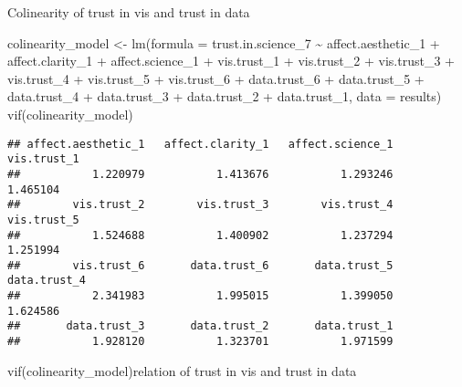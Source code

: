 \documentclass[
]{article}
\newenvironment{Shaded}{\begin{snugshade}}{\end{snugshade}}
\newcommand{\AttributeTok}[1]{\textcolor[rgb]{0.77,0.63,0.00}{#1}}
\newcommand{\FunctionTok}[1]{\textcolor[rgb]{0.00,0.00,0.00}{#1}}
\newcommand{\NormalTok}[1]{#1}
\newcommand{\OtherTok}[1]{\textcolor[rgb]{0.56,0.35,0.01}{#1}}
\newcommand{\SpecialCharTok}[1]{\textcolor[rgb]{0.00,0.00,0.00}{#1}}
\begin{document}
Colinearity of trust in vis and trust in data

\begin{Shaded}
\begin{Highlighting}[]
\NormalTok{colinearity\_model }\OtherTok{\textless{}{-}} \FunctionTok{lm}\NormalTok{(}\AttributeTok{formula =}\NormalTok{ trust.in.science\_7 }\SpecialCharTok{\textasciitilde{}}\NormalTok{ affect.aesthetic\_1 }\SpecialCharTok{+}\NormalTok{ affect.clarity\_1 }\SpecialCharTok{+}\NormalTok{ affect.science\_1 }\SpecialCharTok{+}\NormalTok{ vis.trust\_1 }\SpecialCharTok{+}\NormalTok{ vis.trust\_2 }\SpecialCharTok{+}\NormalTok{ vis.trust\_3 }\SpecialCharTok{+}\NormalTok{ vis.trust\_4 }\SpecialCharTok{+}\NormalTok{ vis.trust\_5 }\SpecialCharTok{+}\NormalTok{ vis.trust\_6 }\SpecialCharTok{+}\NormalTok{ data.trust\_6 }\SpecialCharTok{+}\NormalTok{ data.trust\_5 }\SpecialCharTok{+}\NormalTok{ data.trust\_4 }\SpecialCharTok{+}\NormalTok{ data.trust\_3 }\SpecialCharTok{+}\NormalTok{ data.trust\_2 }\SpecialCharTok{+}\NormalTok{ data.trust\_1,}
            \AttributeTok{data =}\NormalTok{ results)}
\FunctionTok{vif}\NormalTok{(colinearity\_model)}
\end{Highlighting}
\end{Shaded}

\begin{verbatim}
## affect.aesthetic_1   affect.clarity_1   affect.science_1        vis.trust_1 
##           1.220979           1.413676           1.293246           1.465104 
##        vis.trust_2        vis.trust_3        vis.trust_4        vis.trust_5 
##           1.524688           1.400902           1.237294           1.251994 
##        vis.trust_6       data.trust_6       data.trust_5       data.trust_4 
##           2.341983           1.995015           1.399050           1.624586 
##       data.trust_3       data.trust_2       data.trust_1 
##           1.928120           1.323701           1.971599
\end{verbatim}

vif(colinearity\_model)relation of trust in vis and trust in data

\begin{Shaded}
\end{Shaded}
\end{document}
